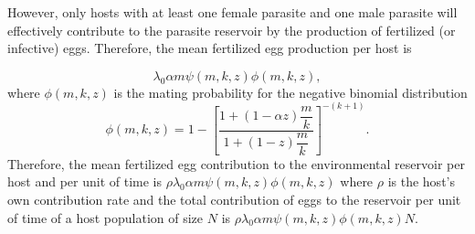 \documentclass[eng]{MMSB-class-eng}
\begin{document}
However, only hosts with at least one female parasite and one male parasite will effectively contribute to the parasite reservoir by the production of fertilized (or infective) eggs. 
Therefore, the mean fertilized egg production per host is

\begin{equation}\label{meanfertilizedeggs}
\lambda_0
\alpha m
\psi(m,k,z)\phi(m,k,z),
\end{equation} 
where $\phi(m,k,z)$ is the mating probability for the negative binomial distribution \citet{lopez2022general}
\begin{equation}\label{phi}
\phi(m,k,z)=1-\left[ \frac{1+ \left( 1-
	\alpha z
	\right) \dfrac{m}{k}}{1+(1-z)\dfrac{m}{k}}\right] ^{-(k+1)}.
\end{equation}
Therefore, the mean fertilized egg contribution to the environmental reservoir  per host and per unit of time is
$\rho\lambda_0
\alpha m
\psi(m,k,z) \phi(m,k,z)$ where $\rho$ 
is the host's own contribution rate and the total contribution of eggs to the reservoir per unit of time of a host population of size $N$ is 
$\rho\lambda_0
\alpha m
\psi(m,k,z) \phi(m,k,z) N$. 
\end{document}

